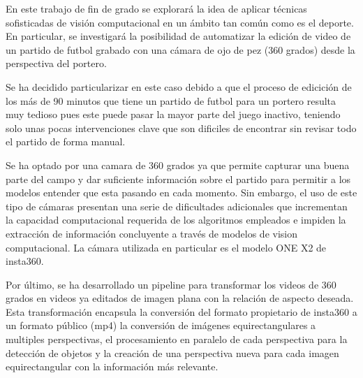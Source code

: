 En este trabajo de fin de grado se explorará la idea de aplicar técnicas sofisticadas de visión computacional en un ámbito tan común como es el deporte. En particular, se investigará la posibilidad de automatizar la edición de video de un partido de futbol grabado con una cámara de ojo de pez (360 grados) desde la perspectiva del portero.

Se ha decidido particularizar en este caso debido a que el proceso de edicición de los más de 90 minutos que tiene un partido de futbol para un portero resulta muy tedioso pues este puede pasar la mayor parte del juego inactivo, teniendo solo unas pocas intervenciones clave que son dificiles de encontrar sin revisar todo el partido de forma manual.

Se ha optado por una camara de 360 grados ya que permite capturar una buena parte del campo y dar suficiente información sobre el partido para permitir a los modelos entender que esta pasando en cada momento. Sin embargo, el uso de este tipo de cámaras presentan una serie de dificultades adicionales que incrementan la capacidad computacional requerida de los algoritmos empleados e impiden la extracción de información concluyente a través de modelos de vision computacional. La cámara utilizada en particular es el modelo ONE X2 de insta360.

Por último, se ha desarrollado un pipeline para transformar los videos de 360 grados en videos ya editados de imagen plana con la relación de aspecto deseada. Esta transformación encapsula la conversión del formato propietario de insta360 a un formato público (mp4) la conversión de imágenes equirectangulares a multiples perspectivas, el procesamiento en paralelo de cada perspectiva para la detección de objetos y la creación de una perspectiva nueva para cada imagen equirectangular con la información más relevante.
